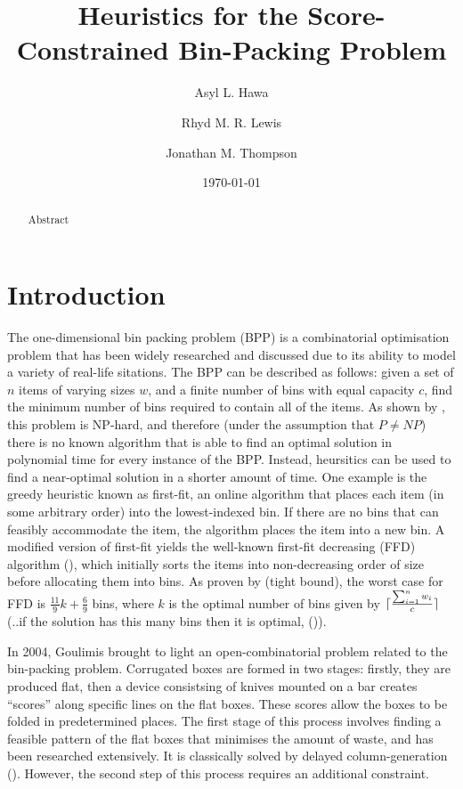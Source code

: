 \documentclass[oribibl]{llncs}
\title{Heuristics for the Score-Constrained Bin-Packing Problem}
\author{Asyl L. Hawa \and Rhyd M. R. Lewis \and Jonathan M. Thompson}
\institute{School of Mathematics, Cardiff University, Senghennydd Road, Cardiff, UK, CF24 4AG}
\date{\today}
\begin{document}
\maketitle

\begin{abstract}
	Abstract
\end{abstract}


\section{Introduction}
\label{sec:intro}

The one-dimensional bin packing problem (BPP) is a combinatorial optimisation problem that has been widely researched and discussed due to its ability to model a variety of real-life sitations.
The BPP can be described as follows: given a set of $n$ items of varying sizes $w$, and a finite number of bins with equal capacity $c$, find the minimum number of bins required to contain all of the items. As shown by \cite{garey1979}, this problem is NP-hard, and therefore (under the assumption that $P \neq NP$) there is no known algorithm that is able to find an optimal solution in polynomial time for every instance of the BPP. Instead, heursitics can be used to find a near-optimal solution in a shorter amount of time. One example is the greedy heuristic known as first-fit, an online algorithm that places each item (in some arbitrary order) into the lowest-indexed bin. If there are no bins that can feasibly accommodate the item, the algorithm places the item into a new bin. A modified version of first-fit yields the well-known first-fit decreasing (FFD) algorithm (\citealp{eilon1971}), which initially sorts the items into non-decreasing order of size before allocating them into bins. As proven by \cite{dosa2007} (tight bound), the worst case for FFD is $\frac{11}{9}k + \frac{6}{9}$ bins, where $k$ is the optimal number of bins given by $\lceil\frac{\sum_{i=1}^{n} w_{i}}{c}\rceil$ (..if the solution has this many bins then it is optimal, (\citealp{korf2002})).

In 2004, Goulimis brought to light an open-combinatorial problem related to the bin-packing problem. Corrugated boxes are formed in two stages: firstly, they are produced flat, then a device consistsing of knives mounted on a bar creates ``scores'' along specific lines on the flat boxes. These scores allow the boxes to be folded in predetermined places. The first stage of this process involves finding a feasible pattern of the flat boxes that minimises the amount of waste, and has been researched extensively. It is classically solved by delayed column-generation (\citealp{gilmore1961, gilmore1963}). However, the second step of this process requires an additional constraint.
\end{document}
